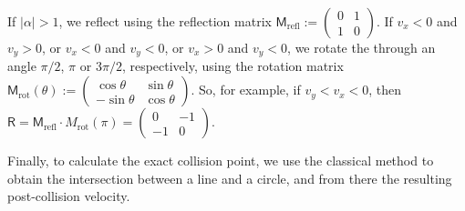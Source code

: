 \documentclass{iopart}
\begin{document}
If $|\alpha|>1$, we reflect using the reflection matrix
$\mathsf{M}_{\mathrm{refl}} := \left(\begin{array}{cc}
0 & 1\\
1 & 0
\end{array}\right)$.
If $v_x<0$ and $v_y>0$, or $v_x<0$ and $v_y<0$, or $v_x>0$ and $v_y<0$, we rotate the  through an angle $\pi/2$, $\pi$ or $3\pi/2$, respectively, using the rotation matrix 
$\mathsf{M}_\mathrm{rot}(\theta) := \left( \begin{array}{cc}
\cos \theta & \sin \theta\\
-\sin \theta & \cos \theta
\end{array} \right)$.
So, for example, if $v_y<v_x<0$, then $\mathsf{R} = 
\mathsf{M}_{\mathrm{refl}} \cdot M_{\mathrm{rot}}(\pi) = \left(\begin{array}{cc}
0 & -1\\
-1 & 0
\end{array}\right)$. 

Finally, to calculate the exact collision point, we use the classical method	 to obtain the intersection between a line and a circle, and from there the resulting post-collision velocity.
\end{document}
